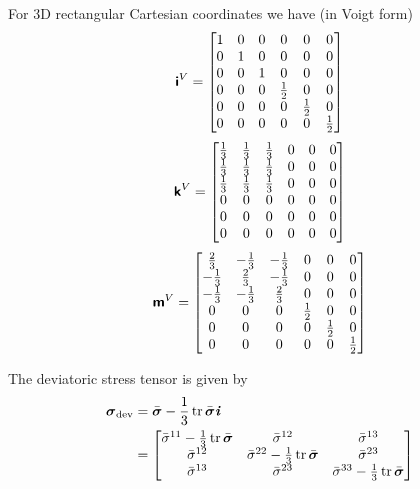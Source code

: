For 3D rectangular Cartesian coordinates we have (in Voigt form)
\begin{equation}
  \boldsymbol{\mathsf{i}}^{V}=\begin{bmatrix}
    1 & 0 & 0 & 0 & 0 & 0 \\
    0 & 1 & 0 & 0 & 0 & 0 \\
    0 & 0 & 1 & 0 & 0 & 0 \\
    0 & 0 & 0 & \frac{1}{2} & 0 & 0 \\
    0 & 0 & 0 & 0 & \frac{1}{2} & 0 \\
    0 & 0 & 0 & 0 & 0 & \frac{1}{2}
  \end{bmatrix}
\end{equation}
\begin{equation}
  \boldsymbol{\mathsf{k}}^{V}=\begin{bmatrix}
    \frac{1}{3} & \frac{1}{3} & \frac{1}{3} & 0 & 0 & 0 \\
    \frac{1}{3} & \frac{1}{3} & \frac{1}{3} & 0 & 0 & 0 \\
    \frac{1}{3} & \frac{1}{3} & \frac{1}{3} & 0 & 0 & 0 \\
    0 & 0 & 0 & 0 & 0 & 0 \\
    0 & 0 & 0 & 0 & 0 & 0 \\
    0 & 0 & 0 & 0 & 0 & 0 
  \end{bmatrix}
\end{equation}
\begin{equation}
  \boldsymbol{\mathsf{m}}^{V}=\begin{bmatrix}
    \frac{2}{3} & -\frac{1}{3} & -\frac{1}{3} & 0 & 0 & 0 \\
    -\frac{1}{3} & \frac{2}{3} & -\frac{1}{3} & 0 & 0 & 0 \\
    -\frac{1}{3} & -\frac{1}{3} & \frac{2}{3} & 0 & 0 & 0 \\
    0 & 0 & 0 & \frac{1}{2} & 0 & 0 \\
    0 & 0 & 0 & 0 & \frac{1}{2} & 0 \\
    0 & 0 & 0 & 0 & 0 & \frac{1}{2}
  \end{bmatrix}
\end{equation}

The deviatoric stress tensor is given by
\begin{equation}
  \begin{split}
    \tensor{\sigma}_{\devop}&=\bar{\tensor{\sigma}}-\dfrac{1}{3}\trace{}{\bar{\tensor{\sigma}}}\tensor{i}
    \\
    &=\begin{bmatrix}
    \bar{\sigma}^{11}-\frac{1}{3}\trace{}{\bar{\tensor{\sigma}}} &
    \bar{\sigma}^{12} & \bar{\sigma}^{13} \\
    \bar{\sigma}^{12} &
    \bar{\sigma}^{22}-\frac{1}{3}\trace{}{\bar{\tensor{\sigma}}} &
    \bar{\sigma}^{23} \\ 
    \bar{\sigma}^{13} & \bar{\sigma}^{23} &
    \bar{\sigma}^{33}-\frac{1}{3}\trace{}{\bar{\tensor{\sigma}}}
    \end{bmatrix}
  \end{split}
\end{equation}

